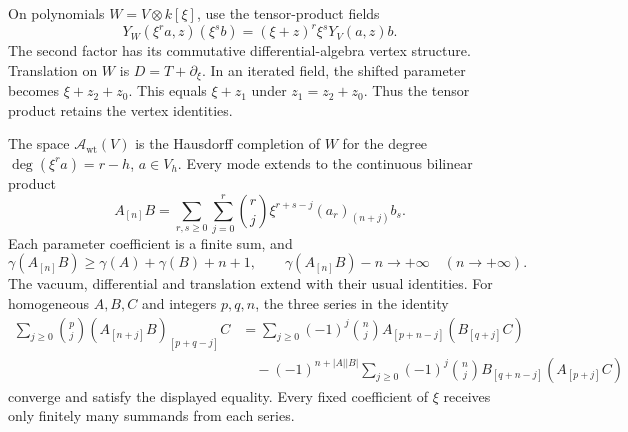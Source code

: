 On polynomials \(W=V\otimes k[\xi]\),
use the tensor-product fields
\begin{equation}\label{v4-eq:singular-parameter-field}
 Y_W(\xi^ra,z)(\xi^sb)
                    =(\xi+z)^r\xi^sY_V(a,z)b.
\end{equation}
The second factor has its commutative
differential-algebra vertex structure.
Translation on \(W\) is \(D=T+\partial_\xi\).
In an iterated field, the shifted
parameter becomes \(\xi+z_2+z_0\).
This equals \(\xi+z_1\) under
\(z_1=z_2+z_0\). Thus the tensor product
retains the vertex identities.

\begin{theorem}\label{v4-thm:singular-completed-modes}
The space \(\mathscr A_{\mathrm{wt}}(V)\)
is the Hausdorff completion of \(W\)
for the degree \(\deg(\xi^ra)=r-h\),
\(a\in V_h\).
Every mode extends to the continuous
bilinear product
\begin{equation}\label{v4-eq:singular-completed-mode}
 A_{[n]}B
    =\sum_{r,s\geq0}\sum_{j=0}^r
       \binom rj\xi^{r+s-j}(a_r)_{(n+j)}b_s.
\end{equation}
Each parameter coefficient is a finite sum,
and
\begin{equation}\label{v4-eq:singular-completed-mode-bound}
 \gamma(A_{[n]}B)\geq\gamma(A)+\gamma(B)+n+1,
 \qquad
 \gamma(A_{[n]}B)-n\longrightarrow+\infty
                         \quad(n\to+\infty).
\end{equation}
The vacuum, differential and translation
extend with their usual identities.
For homogeneous \(A,B,C\) and integers \(p,q,n\),
the three series in the identity
\begin{align}
 \sum_{j\geq0}\binom pj(A_{[n+j]}B)_{[p+q-j]}C
     &=
       \sum_{j\geq0}(-1)^j\binom nj
                       A_{[p+n-j]}(B_{[q+j]}C)
                  \label{v4-eq:singular-completed-Borcherds}\\
     &\quad-
       (-1)^{n+|A||B|}
       \sum_{j\geq0}(-1)^j\binom nj
                       B_{[q+n-j]}(A_{[p+j]}C)
                  \nonumber
\end{align}
converge and satisfy the displayed equality.
Every fixed coefficient of \(\xi\) receives
only finitely many summands from each series.
\end{theorem}

